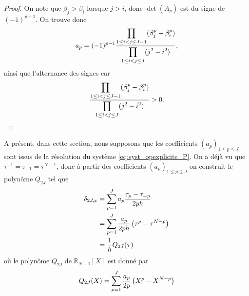 \begin{proof}
On note que $\beta_j > \beta_i$ lorsque $j>i$, donc $\det (A_p)$ est du signe de $(-1)^{p-1}$.
On trouve donc 
\begin{equation}
a_p = (-1)^{p-1} \dfrac{\displaystyle\prod\limits_{1 \leq i <j \leq J-1}(\beta_j^p - \beta_i^p)}{\displaystyle\prod\limits_{1 \leq i <j \leq J}(j^2 - i^2)},
\end{equation}
ainsi que l'alternance des signes car
\begin{equation}
\dfrac{\displaystyle\prod\limits_{1 \leq i <j \leq J-1}(\beta_j^p - \beta_i^p)}{\displaystyle\prod\limits_{1 \leq i <j \leq J}(j^2 - i^2)} > 0.
\end{equation}
\end{proof}
A présent, dans cette section, nous supposons que les coefficients $(a_p)_{1 \leq p \leq J}$ sont issus de la résolution du système \eqref{eq:syst_opexplicite_P}. On a déjà vu que $\tau^{-1} = \tau_{-1} = \tau^{N-1}$, donc à partir des coefficients $(a_p)_{1 \leq p \leq J}$ on construit le polynôme $Q_{2J}$ tel que
\begin{align*}
\delta_{2J,x} & = \displaystyle\sum\limits_{p=1}^J a_p \dfrac{\tau_p - \tau_{-p}}{2ph}\\
	& = \displaystyle\sum\limits_{p=1}^J \dfrac{a_p}{2ph} \left( \tau^p - \tau^{N-p} \right)\\
	& = \dfrac{1}{h} Q_{2J}(\tau)
\end{align*}
où le polynôme $Q_{2J}$ de $\mathbb{R}_{N-1}[X]$ est donné par
\begin{equation}
Q_{2J}(X) = \displaystyle\sum\limits_{p=1}^J \dfrac{a_p}{2p} \left( X^p - X^{N-p} \right)
\end{equation}

